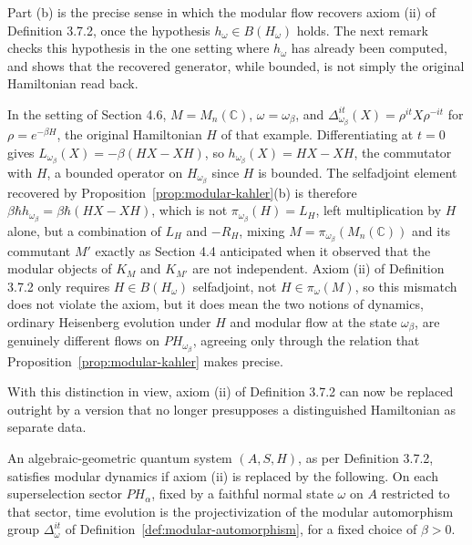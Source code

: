 Part (b) is the precise sense in which the modular flow recovers axiom (ii) of Definition 3.7.2, once the hypothesis $h_\omega \in B(H_\omega)$ holds. The next remark checks this hypothesis in the one setting where $h_\omega$ has already been computed, and shows that the recovered generator, while bounded, is not simply the original Hamiltonian read back.

\begin{remark}
	In the setting of Section 4.6, $M=M_n(\mathbb{C})$, $\omega=\omega_\beta$, and $\Delta_{\omega_\beta}^{it}(X)=\rho^{it}X\rho^{-it}$ for $\rho=e^{-\beta H}$, the original Hamiltonian $H$ of that example. Differentiating at $t=0$ gives $L_{\omega_\beta}(X) = -\beta(HX-XH)$, so $h_{\omega_\beta}(X) = HX-XH$, the commutator with $H$, a bounded operator on $H_{\omega_\beta}$ since $H$ is bounded. The selfadjoint element recovered by Proposition~\ref{prop:modular-kahler}(b) is therefore $\beta\hbar h_{\omega_\beta} = \beta\hbar(HX-XH)$, which is not $\pi_{\omega_\beta}(H)=L_H$, left multiplication by $H$ alone, but a combination of $L_H$ and $-R_H$, mixing $M=\pi_{\omega_\beta}(M_n(\mathbb{C}))$ and its commutant $M'$ exactly as Section 4.4 anticipated when it observed that the modular objects of $K_M$ and $K_{M'}$ are not independent. Axiom (ii) of Definition 3.7.2 only requires $H \in B(H_\omega)$ selfadjoint, not $H \in \pi_\omega(M)$, so this mismatch does not violate the axiom, but it does mean the two notions of dynamics, ordinary Heisenberg evolution under $H$ and modular flow at the state $\omega_\beta$, are genuinely different flows on $PH_{\omega_\beta}$, agreeing only through the relation that Proposition~\ref{prop:modular-kahler} makes precise.
\end{remark}

With this distinction in view, axiom (ii) of Definition 3.7.2 can now be replaced outright by a version that no longer presupposes a distinguished Hamiltonian as separate data.

\begin{definition}\label{def:modular-dynamics-axiom}
	An algebraic-geometric quantum system $(A,S,H)$, as per Definition 3.7.2, satisfies modular dynamics if axiom (ii) is replaced by the following. On each superselection sector $PH_\alpha$, fixed by a faithful normal state $\omega$ on $A$ restricted to that sector, time evolution is the projectivization of the modular automorphism group $\Delta_\omega^{it}$ of Definition~\ref{def:modular-automorphism}, for a fixed choice of $\beta>0$.
\end{definition}

